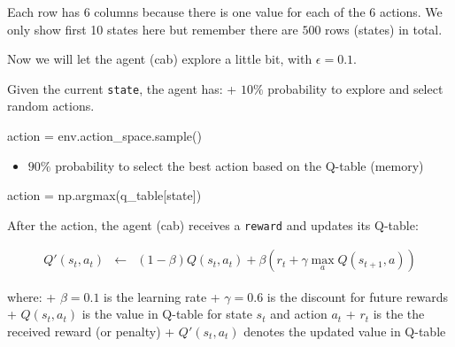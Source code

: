 \documentclass[
  letterpaper,
]{scrbook}
\newenvironment{Shaded}{\begin{snugshade}}{\end{snugshade}}
\newcommand{\NormalTok}[1]{\textcolor[rgb]{0.00,0.23,0.31}{#1}}
\newcommand{\OperatorTok}[1]{\textcolor[rgb]{0.37,0.37,0.37}{#1}}
\providecommand{\tightlist}{%
  \setlength{\itemsep}{0pt}\setlength{\parskip}{0pt}}
\begin{document}
Each row has \(6\) columns because there is one value for each of the
\(6\) actions. We only show first 10 states here but remember there are
\(500\) rows (states) in total.

Now we will let the agent (cab) explore a little bit, with
\(\epsilon=0.1\).

Given the current \texttt{state}, the agent has: + \(10\%\) probability
to explore and select random actions.

\begin{Shaded}
\begin{Highlighting}[]
\NormalTok{action }\OperatorTok{=}\NormalTok{ env.action\_space.sample()}
\end{Highlighting}
\end{Shaded}

\begin{itemize}
\tightlist
\item
  \(90\%\) probability to select the best action based on the Q-table
  (memory)
\end{itemize}

\begin{Shaded}
\begin{Highlighting}[]
\NormalTok{action }\OperatorTok{=}\NormalTok{ np.argmax(q\_table[state])}
\end{Highlighting}
\end{Shaded}

After the action, the agent (cab) receives a \texttt{reward} and updates
its Q-table:

\begin{eqnarray}
Q'(s_t, a_t) & \leftarrow & (1-\beta) Q(s_t, a_t) + \beta (r_t + \gamma \max_a{Q(s_{t+1},a)}) 
\end{eqnarray}

where: + \(\beta = 0.1\) is the learning rate + \(\gamma = 0.6\) is the
discount for future rewards + \(Q(s_t, a_t)\) is the value in Q-table
for state \(s_t\) and action \(a_t\) + \(r_t\) is the the received
reward (or penalty) + \(Q'(s_t, a_t)\) denotes the updated value in
Q-table
\end{document}
